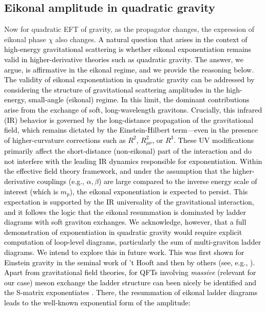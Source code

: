 \subsection{Eikonal amplitude in quadratic gravity}
Now for quadratic EFT of gravity, as the propagator changes, the expression of eikonal phase $\chi$ also changes. \textcolor{black}{ A natural question that arises in the context of high-energy gravitational scattering is whether eikonal exponentiation remains valid in higher-derivative theories such as quadratic gravity. The answer, we argue, is affirmative in the eikonal regime, and we provide the reasoning below. The validity of eikonal exponentiation in quadratic gravity can be addressed by considering the structure of gravitational scattering amplitudes in the high-energy, small-angle (eikonal) regime. In this limit, the dominant contributions arise from the exchange of soft, long-wavelength gravitons. Crucially, this infrared (IR) behavior is governed by the long-distance propagation of the gravitational field, which remains dictated by the Einstein-Hilbert term—even in the presence of higher-curvature corrections such as \( R^2 \), \( R_{\mu\nu}^2 \), or \( R^3 \). These UV modifications primarily affect the short-distance (non-eikonal) part of the interaction and do not interfere with the leading IR dynamics responsible for exponentiation.
Within the effective field theory framework, and under the assumption that the higher-derivative couplings (e.g., \( \alpha, \beta \)) are large compared to the inverse energy scale of interest (which is $m_p$), the eikonal exponentiation is expected to persist. This expectation is supported by the IR universality of the gravitational interaction, and it follows the logic that the eikonal resummation is dominated by ladder diagrams with soft graviton exchanges.
We acknowledge, however, that a full demonstration of exponentiation in quadratic gravity would require explicit computation of loop-level diagrams, particularly the sum of multi-graviton ladder diagrams.  We intend to explore this in future work. This was first shown for Einstein gravity in the seminal work of 't Hooft \cite{tHooft:1987vrq} and then by others (see, e.g., \cite{Kabat:1992tb}). Apart from gravitational field theories, for QFTs involving \textit{massive} (relevant for our case) meson exchange the ladder structure can been nicely be identified and the S-matrix exponentiates \cite{PhysRev.186.1656}. There, the resummation of eikonal ladder diagrams leads to the well-known exponential form of the amplitude:
\begin{align}

\end{align}}
